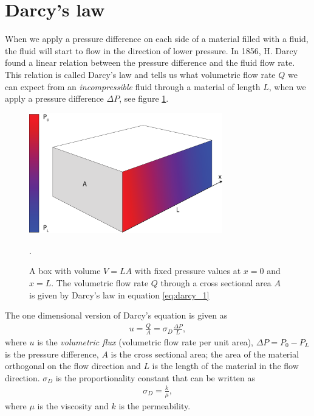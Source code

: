 \section{Darcy's law}
\label{sec:darcy_law}
When we apply a pressure difference on each side of a material filled with a fluid, the fluid will start to flow in the direction of lower pressure. In 1856, H. Darcy found a linear relation between the pressure difference and the fluid flow rate. This relation is called Darcy's law and tells us what volumetric flow rate $Q$ we can expect from an \textit{incompressible} fluid through a material of length $L$, when we apply a pressure difference $\Delta P$, see figure \ref{fig:darcys_law}. 
\begin{figure}[htb]
\begin{center}
\includegraphics[width=0.75\textwidth, trim=0cm 0cm 0cm 0cm, clip]{kinetic_theory/figures/darcy.eps}
\end{center}
\caption{A box with volume $V=LA$ with fixed pressure values at $x=0$ and $x=L$. The volumetric flow rate $Q$ through a cross sectional area $A$ is given by Darcy's law in equation \eqref{eq:darcy_1}}.
\label{fig:darcys_law}
\end{figure}
The one dimensional version of Darcy's equation is given as 
\begin{align}
\label{eq:darcy_1}
	u = \frac{Q}{A} = \sigma_D\frac{\Delta P}{ L},
\end{align}
where $u$ is the \textit{volumetric flux} (volumetric flow rate per unit area), $\Delta P = P_0 - P_L$ is the pressure difference, $A$ is the cross sectional area; the area of the material orthogonal on the flow direction and $L$ is the length of the material in the flow direction. $\sigma_D$ is the proportionality constant that can be written as
\begin{align}
	\sigma_D = \frac{k}{\mu},
\end{align}
where $\mu$ is the viscosity and $k$ is the permeability.
